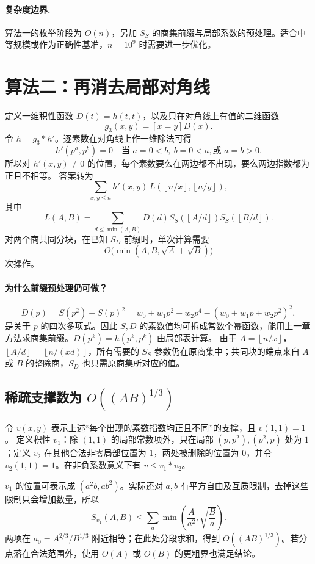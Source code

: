 \documentclass[UTF8,a4paper,11pt,twoside,openright,fontset=fandol]{ctexbook}
\theoremstyle{definition}
\newcommand{\floor}[1]{\left\lfloor #1\right\rfloor}
\begin{document}
\paragraph{复杂度边界.} 算法一的枚举阶段为 $O(n)$，另加 $S_S$ 的商集前缀与局部系数的预处理。适合中等规模或作为正确性基准，$n=10^9$ 时需要进一步优化。


\section{算法二：再消去局部对角线}
定义一维积性函数 $D(t)=h(t,t)$，以及只在对角线上有值的二维函数
\[
 g_3(x,y)=[x=y]D(x).
\]
令 $h=g_3*h'$。逐素数在对角线上作一维除法可得
\[
 h'(p^a,p^b)=0\quad\text{当 }a=0<b,\ b=0<a,\text{或 }a=b>0.
\]
所以对 $h'(x,y)\ne0$ 的位置，每个素数要么在两边都不出现，要么两边指数都为正且不相等。
答案转为
\[
 \sum_{x,y\le n}h'(x,y)\,L(\floor{n/x},\floor{n/y}),
\]
其中
\[
 L(A,B)=\sum_{d\le\min(A,B)}D(d)
 S_S(\floor{A/d})S_S(\floor{B/d}).
\]
对两个商共同分块，在已知 $S_D$ 前缀时，单次计算需要
\[
 O\bigl(\min(A,B,\sqrt A+\sqrt B)\bigr)
\]
次操作。


\paragraph{为什么前缀预处理仍可做？}
\[
 D(p)=S(p^2)-S(p)^2
 =w_0+w_1p^2+w_2p^4-(w_0+w_1p+w_2p^2)^2,
\]
是关于 $p$ 的四次多项式。因此 $S,D$ 的素数值均可拆成常数个幂函数，能用上一章方法求商集前缀。$D(p^k)=h(p^k,p^k)$ 由局部表计算。
由于 $A=\floor{n/x}$，$\floor{A/d}=\floor{n/(xd)}$，所有需要的 $S_S$ 参数仍在原商集中；共同块的端点来自 $A$ 或 $B$ 的整除商，$S_D$ 也只需原商集所对应的值。

\subsection{稀疏支撑数为 \texorpdfstring{$O((AB)^{1/3})$}{O((AB)1/3)}}
令 $v(x,y)$ 表示上述“每个出现的素数指数均正且不同”的支撑，且 $v(1,1)=1$。
定义积性 $v_1$：除 $(1,1)$ 的局部常数项外，只在局部 $(p,p^2),(p^2,p)$ 处为 $1$；定义 $v_2$ 在其他合法非零局部位置为 $1$，两处被删除的位置为 $0$，并令 $v_2(1,1)=1$。在非负系数意义下有 $v\le v_1*v_2$。

$v_1$ 的位置可表示成 $(a^2b,ab^2)$。实际还对 $a,b$ 有平方自由及互质限制，去掉这些限制只会增加数量，所以
\[
 S_{v_1}(A,B)\le\sum_a\min\left(\frac A{a^2},\sqrt{\frac Ba}\right).
\]
两项在 $a_0=A^{2/3}/B^{1/3}$ 附近相等；在此处分段求和，得到 $O((AB)^{1/3})$。若分点落在合法范围外，使用 $O(A)$ 或 $O(B)$ 的更粗界也满足结论。
\end{document}
